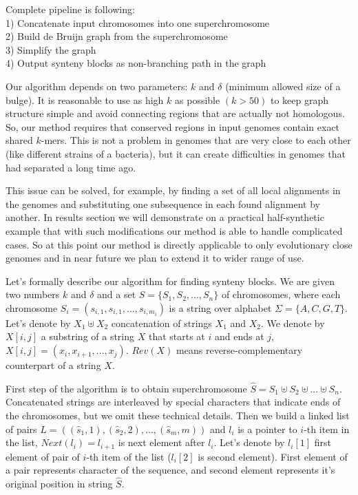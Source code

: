 \documentclass[a4paper, 12pt]{scrartcl}
\begin{document}
Complete pipeline is following:\\
1) Concatenate input chromosomes into one superchromosome \\
2) Build de Bruijn graph from the superchromosome \\
3) Simplify the graph \\
4) Output synteny blocks as non-branching path in the graph 

Our algorithm depends on two parameters: \(k\) and \(\delta\) (minimum allowed size of a bulge). It is reasonable to use as high \(k\) as possible
\((k > 50)\) to keep graph structure simple and avoid connecting regions that are actually not homologous. So, our method requires that conserved regions
in input genomes contain exact shared \(k\)-mers. This is not a problem in genomes that are very close to each other (like different strains of a bacteria),
but it can create difficulties in genomes that had separated a long time ago.

This issue can be solved, for example, by finding a set of all local alignments in the genomes and substituting one subsequence in each found alignment
by another. In results section we will demonstrate on a practical half-synthetic example that with such modifications our method is able to handle
complicated cases. So at this point our method is directly applicable to only evolutionary close genomes and  in near future we plan to extend it to
wider range of use.

Let's formally describe our algorithm for finding synteny blocks. We are given two numbers \(k\) and \(\delta\) and a
set \(S = \lbrace S_{1}, S_{2}, \ldots, S_{n} \rbrace \) of chromosomes,
where each chromosome  \(S_{i} = (s_{i, 1}, s_{i, 1}, \ldots, s_{i, m_i})\) is a string over alphabet \(\Sigma = \lbrace A, C, G, T \rbrace\).
Let's denote by \(X_{1} \uplus X_{2}\) concatenation of strings \(X_{1}\) and \(X_{2}\). We denote by \(X[i, j]\) a substring of a string \(X\) that
starts at \(i\) and ends at \(j\), \(X[i, j] = (x_{i}, x_{i + 1}, \ldots, x_{j}) \). \(Rev(X)\) means reverse-complementary counterpart of a string \(X\).

First step of the algorithm is to obtain superchromosome \(\hat{S} = S_{1} \uplus S_{2} \uplus \ldots \uplus S_{n} \). Concatenated
strings are interleaved by special characters that indicate ends of the chromosomes, but we omit these technical details. Then we build a linked list of
pairs \(L = ((\hat{s}_1, 1), (\hat{s}_2, 2), \ldots, (\hat{s}_{m}, m))\) and \(l_i\) is a pointer to \(i\)-th item in the list, \(Next(l_i) = l_{i + 1}\) is next
element after \(l_i\). Let's denote by \(l_i[1]\) first element of pair of \(i\)-th item of the list (\(l_i[2]\) is second element). First element of a pair represents
character of the sequence, and second element represents it's original position in string \(\hat{S}\). 
\end{document}

